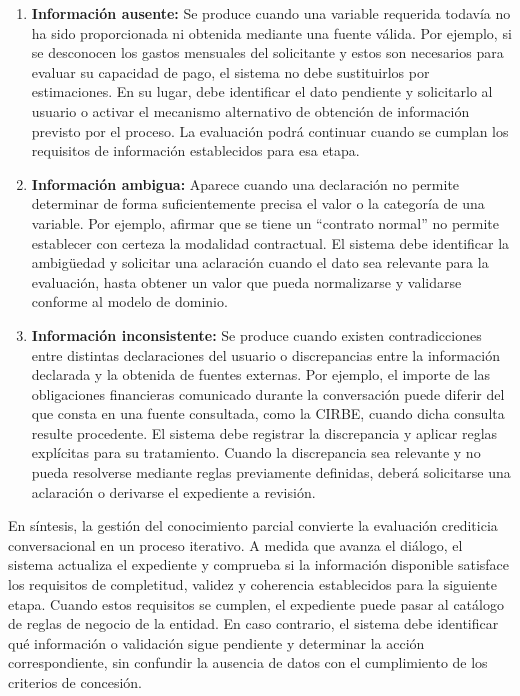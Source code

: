 \documentclass[12pt,a4paper]{report}
\begin{document}
\begin{enumerate}
	\item \textbf{Información ausente:} Se produce cuando una variable requerida todavía no ha sido proporcionada ni obtenida mediante una fuente válida. Por ejemplo, si se desconocen los gastos mensuales del solicitante y estos son necesarios para evaluar su capacidad de pago, el sistema no debe sustituirlos por estimaciones. En su lugar, debe identificar el dato pendiente y solicitarlo al usuario o activar el mecanismo alternativo de obtención de información previsto por el proceso. La evaluación podrá continuar cuando se cumplan los requisitos de información establecidos para esa etapa.

	\item \textbf{Información ambigua:} Aparece cuando una declaración no permite determinar de forma suficientemente precisa el valor o la categoría de una variable. Por ejemplo, afirmar que se tiene un ``contrato normal'' no permite establecer con certeza la modalidad contractual. El sistema debe identificar la ambigüedad y solicitar una aclaración cuando el dato sea relevante para la evaluación, hasta obtener un valor que pueda normalizarse y validarse conforme al modelo de dominio.

	\item \textbf{Información inconsistente:} Se produce cuando existen contradicciones entre distintas declaraciones del usuario o discrepancias entre la información declarada y la obtenida de fuentes externas. Por ejemplo, el importe de las obligaciones financieras comunicado durante la conversación puede diferir del que consta en una fuente consultada, como la CIRBE, cuando dicha consulta resulte procedente. El sistema debe registrar la discrepancia y aplicar reglas explícitas para su tratamiento. Cuando la discrepancia sea relevante y no pueda resolverse mediante reglas previamente definidas, deberá solicitarse una aclaración o derivarse el expediente a revisión.
\end{enumerate}

En síntesis, la gestión del conocimiento parcial convierte la evaluación crediticia conversacional en un proceso iterativo. A medida que avanza el diálogo, el sistema actualiza el expediente y comprueba si la información disponible satisface los requisitos de completitud, validez y coherencia establecidos para la siguiente etapa. Cuando estos requisitos se cumplen, el expediente puede pasar al catálogo de reglas de negocio de la entidad. En caso contrario, el sistema debe identificar qué información o validación sigue pendiente y determinar la acción correspondiente, sin confundir la ausencia de datos con el cumplimiento de los criterios de concesión.
\end{document}
